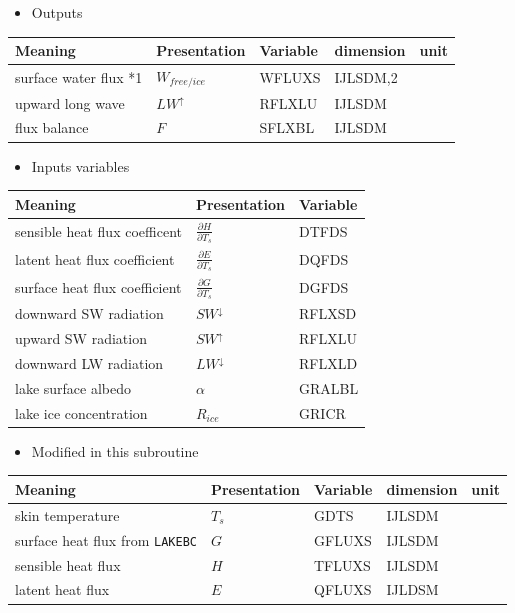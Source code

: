 \begin{itemize}
\tightlist
\item
  Outputs
\end{itemize}

\setlength\LTleft{0pt}\setlength\LTright{0pt}\begin{longtable}[]{@{}lllll@{}}
\toprule\relax
Meaning & Presentation & Variable & dimension & unit\tabularnewline
\midrule\relax
\endhead
surface water flux *1 & \(W_{free/ice}\) & WFLUXS & IJLSDM,2
&\tabularnewline
upward long wave & \(LW^\uparrow\) & RFLXLU & IJLSDM &\tabularnewline
flux balance & \(F\) & SFLXBL & IJLSDM &\tabularnewline
\bottomrule
\end{longtable}

\begin{itemize}
\tightlist
\item
  Inputs variables
\end{itemize}

\setlength\LTleft{0pt}\setlength\LTright{0pt}\begin{longtable}[]{@{}lll@{}}
\toprule\relax
Meaning & Presentation & Variable\tabularnewline
\midrule\relax
\endhead
sensible heat flux coefficent & \(\frac{\partial H}{\partial T_s}\) &
DTFDS\tabularnewline
latent heat flux coefficient & \(\frac{\partial E}{\partial T_s}\) &
DQFDS\tabularnewline
surface heat flux coefficient & \(\frac{\partial G}{\partial T_s}\) &
DGFDS\tabularnewline
downward SW radiation & \(SW^\downarrow\) & RFLXSD\tabularnewline
upward SW radiation & \(SW^\uparrow\) & RFLXLU\tabularnewline
downward LW radiation & \(LW^\downarrow\) & RFLXLD\tabularnewline
lake surface albedo & \(\alpha\) & GRALBL\tabularnewline
lake ice concentration & \(R_{ice}\) & GRICR\tabularnewline
\bottomrule
\end{longtable}

\begin{itemize}
\tightlist
\item
  Modified in this subroutine
\end{itemize}

\setlength\LTleft{0pt}\setlength\LTright{0pt}\begin{longtable}[]{@{}lllll@{}}
\toprule\relax
Meaning & Presentation & Variable & dimension & unit\tabularnewline
\midrule\relax
\endhead
skin temperature & \(T_s\) & GDTS & IJLSDM &\tabularnewline
surface heat flux from \texttt{LAKEBC} & \(G\) & GFLUXS & IJLSDM
&\tabularnewline
sensible heat flux & \(H\) & TFLUXS & IJLSDM &\tabularnewline
latent heat flux & \(E\) & QFLUXS & IJLDSM &\tabularnewline
\bottomrule
\end{longtable}

